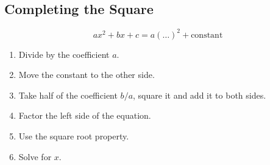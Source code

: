 \documentclass[12pt, a5paper]{article}
\begin{document}
\subsection*{Completing the Square}
$$
ax^2 + bx + c = a ( \ldots )^2 + \text{constant}
$$

\begin{enumerate}
\item{Divide by the coefficient $a$.}
\item{Move the constant to the other side.}
\item{Take half of the coefficient $b/a$, square it and add it to both sides.}
\item{Factor the left side of the equation.}
\item{Use the square root property.}
\item{Solve for $x$.}
\end{enumerate}
\end{document}
